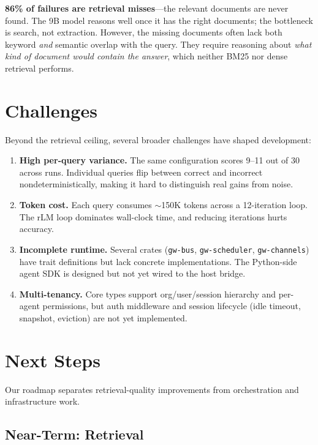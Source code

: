 \documentclass[11pt,a4paper]{article}
\begin{document}
\textbf{86\% of failures are retrieval misses}---the relevant documents are
never found. The 9B model reasons well once it has the right documents; the
bottleneck is search, not extraction. However, the missing documents often lack
both keyword \emph{and} semantic overlap with the query. They require reasoning
about \emph{what kind of document would contain the answer}, which neither BM25
nor dense retrieval performs.

\section{Challenges}

Beyond the retrieval ceiling, several broader challenges have shaped
development:

\begin{enumerate}[nosep]
  \item \textbf{High per-query variance.} The same configuration scores 9--11
        out of 30 across runs. Individual queries flip between correct and
        incorrect nondeterministically, making it hard to distinguish real gains
        from noise.
  \item \textbf{Token cost.} Each query consumes $\sim$150K tokens across a
        12-iteration loop. The rLM loop dominates wall-clock time, and reducing
        iterations hurts accuracy.
  \item \textbf{Incomplete runtime.} Several crates (\texttt{gw-bus},
        \texttt{gw-scheduler}, \texttt{gw-channels}) have trait definitions but
        lack concrete implementations. The Python-side agent SDK is designed but
        not yet wired to the host bridge.
  \item \textbf{Multi-tenancy.} Core types support org/user/session hierarchy
        and per-agent permissions, but auth middleware and session lifecycle
        (idle timeout, snapshot, eviction) are not yet implemented.
\end{enumerate}

\section{Next Steps}

Our roadmap separates retrieval-quality improvements from orchestration and
infrastructure work.

\subsection{Near-Term: Retrieval}
\end{document}
